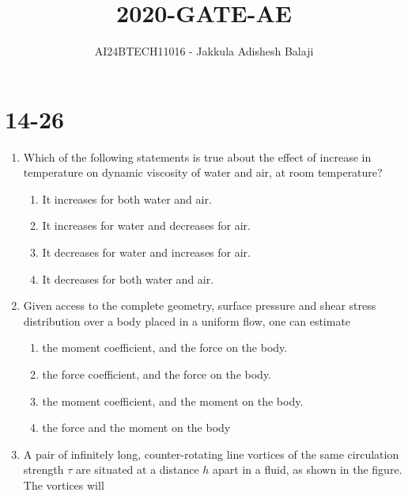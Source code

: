 \documentclass[journal]{IEEEtran}
\begin{document}

\title{2020-GATE-AE}
\author{AI24BTECH11016 - Jakkula Adishesh Balaji}
{\let\newpage\relax\maketitle}

\renewcommand{\thefigure}{\theenumi}
\renewcommand{\thetable}{\theenumi}
\setlength{\intextsep}{10pt} %
\section{14-26}
\begin{enumerate}
	\item
	Which of the following statements is true about the effect of increase in temperature on dynamic viscosity of water and air, at room temperature?
		\begin{enumerate}
			\item It increases for both water and air.
			\item It increases for water and decreases for air.
			\item It decreases for water and increases for air.
			\item It decreases for both water and air.
		\end{enumerate}
	\item 
	Given access to the complete geometry, surface pressure and shear stress distribution over a body placed in a uniform flow, one can estimate
		\begin{enumerate}
			\item the moment coefficient, and the force on the body.
			\item the force coefficient, and the force on the body.
			\item the moment coefficient, and the moment on the body.
			\item the force and the moment on the body
		\end{enumerate}
	\item
	A pair of infinitely long, counter-rotating line vortices of the same circulation strength $\tau$ are situated at a distance $h$ apart in a fluid, as shown in the figure. The vortices will
	\begin{figure}[H]
    		\centering
    		
    		\caption{}
    		\label{36}
	\end{figure}
		\begin{enumerate}

\end{enumerate}
\end{enumerate}
\end{document}
